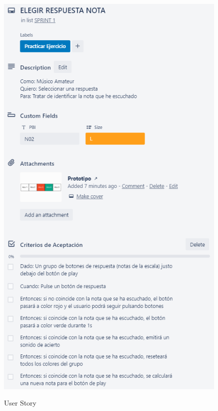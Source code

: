 \documentclass[12pt,twoside,titlepage]{report}
\begin{document}
{\begin{figure}[H]
    \centering
    \includegraphics[scale=1.3]{Scrum/User Stories/NotasRespuestas}
    \label{fig:NotasRespuestas}
    \caption{User Story}
\end{figure}

}
\end{document}
